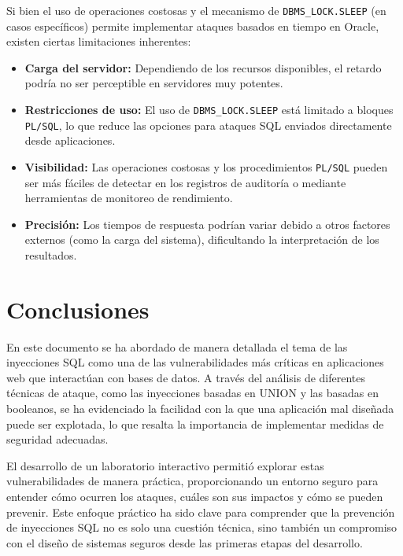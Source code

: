 \documentclass[a4paper,12pt]{article}
\begin{document}
Si bien el uso de operaciones costosas y el mecanismo de \texttt{DBMS\_LOCK.SLEEP} (en casos específicos) permite implementar ataques basados en tiempo en Oracle, existen ciertas limitaciones inherentes:
\begin{itemize}
    \item \textbf{Carga del servidor:} Dependiendo de los recursos disponibles, el retardo podría no ser perceptible en servidores muy potentes.
    \item \textbf{Restricciones de uso:} El uso de \texttt{DBMS\_LOCK.SLEEP} está limitado a bloques \texttt{PL/SQL}, lo que reduce las opciones para ataques SQL enviados directamente desde aplicaciones.
    \item \textbf{Visibilidad:} Las operaciones costosas y los procedimientos \texttt{PL/SQL} pueden ser más fáciles de detectar en los registros de auditoría o mediante herramientas de monitoreo de rendimiento.
    \item \textbf{Precisión:} Los tiempos de respuesta podrían variar debido a otros factores externos (como la carga del sistema), dificultando la interpretación de los resultados.
\end{itemize}

\section{Conclusiones}

En este documento se ha abordado de manera detallada el tema de las inyecciones SQL como una de las vulnerabilidades más críticas en aplicaciones web que interactúan con bases de datos. A través del análisis de diferentes técnicas de ataque, como las inyecciones basadas en UNION y las basadas en booleanos, se ha evidenciado la facilidad con la que una aplicación mal diseñada puede ser explotada, lo que resalta la importancia de implementar medidas de seguridad adecuadas.

\vspace{0,5cm}

El desarrollo de un laboratorio interactivo permitió explorar estas vulnerabilidades de manera práctica, proporcionando un entorno seguro para entender cómo ocurren los ataques, cuáles son sus impactos y cómo se pueden prevenir. Este enfoque práctico ha sido clave para comprender que la prevención de inyecciones SQL no es solo una cuestión técnica, sino también un compromiso con el diseño de sistemas seguros desde las primeras etapas del desarrollo.
\end{document}
